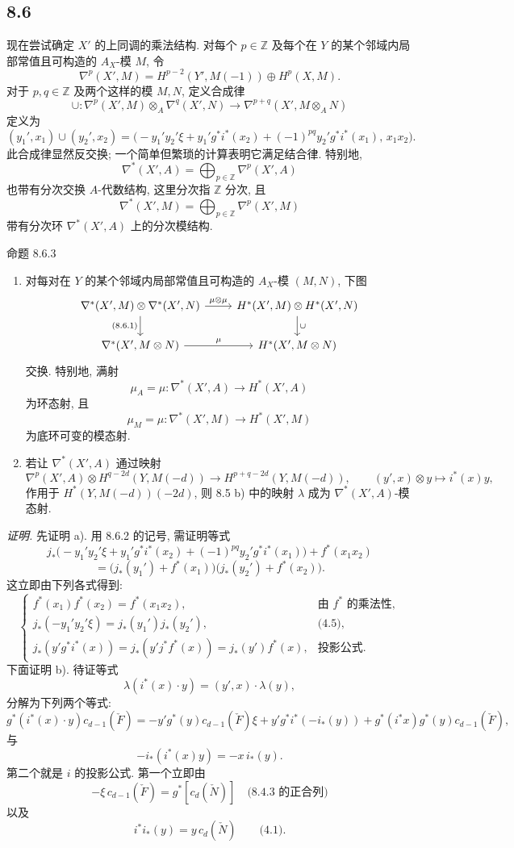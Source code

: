 \subsection*{8.6}

现在尝试确定 $X'$ 的上同调的乘法结构. 对每个 $p\in\mathbb Z$ 及每个在 $Y$ 的某个邻域内局部常值且可构造的 $A_X$-模 $M$, 令
\[
\nabla^p(X',M)=H^{p-2}(Y',M(-1))\oplus H^p(X,M).
\]
对于 $p,q\in\mathbb Z$ 及两个这样的模 $M,N$, 定义合成律
\[
\cup:\nabla^p(X',M)\otimes_A\nabla^q(X',N)\to
\nabla^{p+q}(X',M\otimes_A N)
\tag{8.6.1}
\]
定义为
\[
(y_1',x_1)\cup(y_2',x_2)=
\bigl(-y_1'y_2'\xi+y_1'g^*i^*(x_2)+(-1)^{pq}y_2'g^*i^*(x_1),\,x_1x_2\bigr).
\tag{8.6.2}
\]
此合成律显然反交换; 一个简单但繁琐的计算表明它满足结合律. 特别地,
\[
\nabla^*(X',A)=\bigoplus_{p\in\mathbb Z}\nabla^p(X',A)
\]
也带有分次交换 $A$-代数结构, 这里分次指 $\mathbb Z$ 分次, 且
\[
\nabla^*(X',M)=\bigoplus_{p\in\mathbb Z}\nabla^p(X',M)
\]
带有分次环 $\nabla^*(X',A)$ 上的分次模结构.

\begin{statement}{命题 8.6.3}
\begin{enumerate}[label=\alph*)]
\item 对每对在 $Y$ 的某个邻域内局部常值且可构造的 $A_X$-模 $(M,N)$, 下图
\[
\begin{tikzcd}
\nabla^*(X',M)\otimes\nabla^*(X',N)\arrow[r,"\mu\otimes\mu"]\arrow[d,"{(8.6.1)}"']&
H^*(X',M)\otimes H^*(X',N)\arrow[d,"\cup"]\\
\nabla^*(X',M\otimes N)\arrow[r,"\mu"]&
H^*(X',M\otimes N)
\end{tikzcd}
\]
交换. 特别地, 满射
\[
\mu_A=\mu:\nabla^*(X',A)\to H^*(X',A)
\]
为环态射, 且
\[
\mu_M=\mu:\nabla^*(X',M)\to H^*(X',M)
\]
为底环可变的模态射.
\item 若让 $\nabla^*(X',A)$ 通过映射
\[
\nabla^p(X',A)\otimes H^{q-2d}(Y,M(-d))
\to H^{p+q-2d}(Y,M(-d)),
\qquad
(y',x)\otimes y\mapsto i^*(x)y,
\]
作用于 $H^*(Y,M(-d))(-2d)$, 则 8.5 b) 中的映射 $\lambda$ 成为 $\nabla^*(X',A)$-模态射.
\end{enumerate}
\end{statement}

\emph{证明.} 先证明 a). 用 8.6.2 的记号, 需证明等式
\[
j_*\bigl(-y_1'y_2'\xi+y_1'g^*i^*(x_2)+(-1)^{pq}y_2'g^*i^*(x_1)\bigr)+f^*(x_1x_2)
\]
\[
=\bigl(j_*(y_1')+f^*(x_1)\bigr)\bigl(j_*(y_2')+f^*(x_2)\bigr).
\]
这立即由下列各式得到:
\[
\begin{cases}
f^*(x_1)f^*(x_2)=f^*(x_1x_2),&\text{由 }f^*\text{ 的乘法性},\\
j_*(-y_1'y_2'\xi)=j_*(y_1')j_*(y_2'),&\text{(4.5)},\\
j_*(y'g^*i^*(x))=j_*(y'j^*f^*(x))=j_*(y')f^*(x),&\text{投影公式}.
\end{cases}
\]
下面证明 b). 待证等式
\[
\lambda(i^*(x)\cdot y)=(y',x)\cdot\lambda(y),
\]
分解为下列两个等式:
\[
g^*(i^*(x)\cdot y)c_{d-1}(\check F)
=
-y'g^*(y)c_{d-1}(\check F)\xi
+y'g^*i^*(-i_*(y))
+g^*(i^*x)g^*(y)c_{d-1}(\check F),
\]
与
\[
-i_*(i^*(x)y)=-x\,i_*(y).
\]
第二个就是 $i$ 的投影公式. 第一个立即由
\[
-\xi\,c_{d-1}(\check F)=g^*[c_d(\check N)]
\quad\text{(8.4.3 的正合列)}
\]
以及
\[
i^*i_*(y)=y\,c_d(\check N)\qquad\text{(4.1)}.
\]

